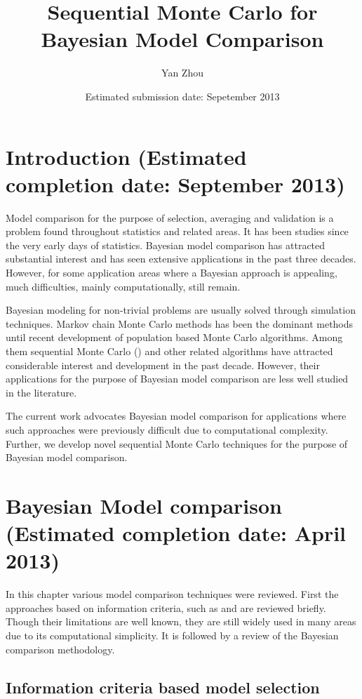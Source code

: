 \documentclass[11pt, bib, fontset = Minion]{marticle}
\title{Sequential Monte Carlo for Bayesian Model Comparison}
\author{Yan Zhou}
\date{Estimated submission date: Sepetember 2013}
\def\finish#1{(Estimated completion date: #1 2013)}
\begin{document}
\maketitle

\section{Introduction \finish{September}}

Model comparison for the purpose of selection, averaging and validation is a
problem found throughout statistics and related areas. It has been studies
since the very early days of statistics. Bayesian model comparison has
attracted substantial interest and has seen extensive applications in the past
three decades. However, for some application areas where a Bayesian approach
is appealing, much difficulties, mainly computationally, still remain.

Bayesian modeling for non-trivial problems are usually solved through
simulation techniques. Markov chain Monte Carlo methods has been the dominant
methods until recent development of population based Monte Carlo algorithms.
Among them sequential Monte Carlo (\smc) and other related algorithms have
attracted considerable interest and development in the past decade. However,
their applications for the purpose of Bayesian model comparison are less well
studied in the literature.

The current work advocates Bayesian model comparison for applications where
such approaches were previously difficult due to computational complexity.
Further, we develop novel sequential Monte Carlo techniques for the purpose of
Bayesian model comparison.

\section{Bayesian Model comparison \finish{April}}

In this chapter various model comparison techniques were reviewed. First the
approaches based on information criteria, such as \aic and \bic are reviewed
briefly. Though their limitations are well known, they are still widely used
in many areas due to its computational simplicity. It is followed by a review
of the Bayesian comparison methodology.

\subsection{Information criteria based model selection}
\end{document}

